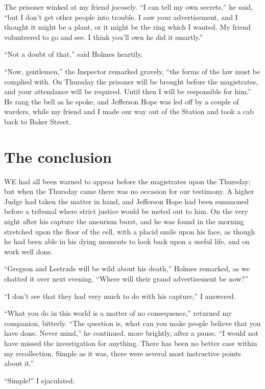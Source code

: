 \documentclass[12pt]{book}
\begin{document}
The prisoner winked at my friend jocosely. “I can tell my own secrets,” he said, “but I don’t get other people into trouble. I saw your advertisement, and I thought it might be a plant, or it might be the ring which I wanted. My friend volunteered to go and see. I think you’ll own he did it smartly.” 

“Not a doubt of that,” said Holmes heartily. 

“Now, gentlemen,” the Inspector remarked gravely, “the forms of the law must be complied with. On Thursday the prisoner will be brought before the magistrates, and your attendance will be required. Until then I will be responsible for him.” He rang the bell as he spoke, and Jefferson Hope was led off by a couple of warders, while my friend and I made our way out of the Station and took a cab back to Baker Street. 







\chapter{The conclusion}

WE had all been warned to appear before the magistrates upon the Thursday; but when the Thursday came there was no occasion for our testimony. A higher Judge had taken the matter in hand, and Jefferson Hope had been summoned before a tribunal where strict justice would be meted out to him. On the very night after his capture the aneurism burst, and he was found in the morning stretched upon the floor of the cell, with a placid smile upon his face, as though he had been able in his dying moments to look back upon a useful life, and on work well done. 

“Gregson and Lestrade will be wild about his death,” Holmes remarked, as we chatted it over next evening. “Where will their grand advertisement be now?” 

“I don’t see that they had very much to do with his capture,” I answered. 

“What you do in this world is a matter of no consequence,” returned my companion, bitterly. “The question is, what can you make people believe that you have done. Never mind,” he continued, more brightly, after a pause. “I would not have missed the investigation for anything. There has been no better case within my recollection. Simple as it was, there were several most instructive points about it.” 

“Simple!” I ejaculated. 
\end{document}
